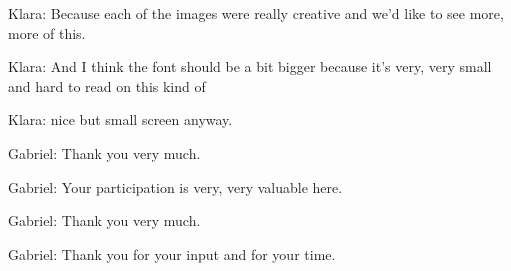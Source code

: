 Klara: Because each of the images were really creative and we'd like to see more, more of this.

Klara: And I think the font should be a bit bigger because it's very, very small and hard to read on this kind of

Klara: nice but small screen anyway.

Gabriel: Thank you very much.

Gabriel: Your participation is very, very valuable here.

Gabriel: Thank you very much.

Gabriel: Thank you for your input and for your time.

